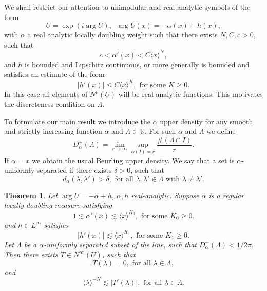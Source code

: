 \documentclass{article}[12pt]
\newtheorem{theorem}{Theorem}
\theoremstyle{remark}
\begin{document}
We shall restrict our attention to unimodular and real analytic symbols of the form
\begin{equation*}
    U = \exp(i\arg U), \; \; \arg U(x) = -\alpha(x) + h(x),
\end{equation*}
with $\alpha$ a real analytic locally doubling weight such that there exists $N, C, c > 0$, such that
\begin{equation*}
    c <\alpha'(x) < C\langle x \rangle^{N},
\end{equation*}
and $h$ is bounded and Lipschitz continuous, or more generally is bounded and satisfies an estimate of the form
\begin{equation*}
    \lvert h'(x) \rvert \leq C\langle x \rangle^{K}, \text{ for some } K \geq 0.
\end{equation*}
In this case all elements of $N^{p}(U)$ will be real analytic functions. This motivates the discreteness condition on $\Lambda$.\newline

To formulate our main result we introduce the $\alpha$ upper density for any smooth and strictly increasing function $\alpha$ and $\Lambda \subset \mathbb{R}$. For such $\alpha$ and $\Lambda$ we define
\begin{equation*}
    D_{\alpha}^{+}(\Lambda) = \lim_{r \to \infty}\sup_{\alpha(I) = r} \frac{\#(\Lambda \cap I)}{r}.
\end{equation*}
If $\alpha = x$ we obtain the usual Beurling upper density. We say that a set is $\alpha$-uniformly separated if there exists $\delta > 0$, such that
    \begin{equation*}
        d_{\alpha}(\lambda,\lambda') > \delta, \text{ for all } \lambda, \lambda' \in \Lambda \text{ with } \lambda \neq \lambda'.
    \end{equation*}

\begin{theorem}\label{thm:zero_function}
            Let $\arg U = -\alpha + h$, $\alpha, h$ real-analytic. Suppose $\alpha$ is a regular locally doubling measure satisfying
        \begin{equation*}
            1\lesssim \alpha'(x) \lesssim \langle x \rangle^{K_{0}}, \text{ for some } K_{0} \geq 0.
        \end{equation*}
        and $h \in L^{\infty}$ satisfies
        \begin{equation*}
            \lvert h'(x) \rvert \lesssim \langle x \rangle^{K_{1}}, \text{ for some } K_{1} \geq 0.
        \end{equation*}
        Let $\Lambda$ be a $\alpha$-uniformly separated subset of the line, such that $D_{\alpha}^{+}(\Lambda)< 1/2\pi$. Then there exists $T \in N^{\infty}(U)$, such that
        \begin{equation*}
            T(\lambda) = 0, \text{ for all } \lambda \in \Lambda,
        \end{equation*}
        and
        \begin{equation*}
            \langle \lambda\rangle^{-N} \lesssim \lvert T'(\lambda) \rvert , \text{ for all  } \lambda \in \Lambda.
        \end{equation*}
\end{theorem}
\end{document}
